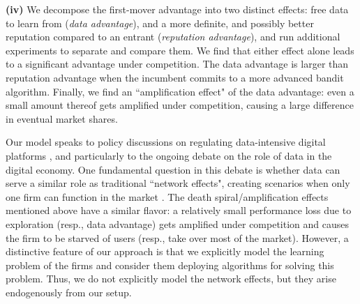 \textbf{(iv)} We decompose the first-mover advantage into two distinct effects: free data to learn from (\emph{data advantage}), and a more definite, and possibly better reputation compared to an entrant (\emph{reputation advantage}), and run additional experiments to separate and compare them. We find that either effect alone leads to a significant advantage under competition. The data advantage is larger than reputation advantage when the incumbent commits to a more advanced bandit algorithm. Finally, we find an ``amplification effect" of the data advantage: even a small amount thereof gets amplified under competition, causing a large difference in eventual market shares.



Our model speaks to policy discussions on regulating data-intensive digital platforms \citep{furman2019unlocking, scott2019committee}, and particularly to the ongoing debate on the role of data in the digital economy. One fundamental question in this debate is whether data can serve a similar role as traditional ``network effects", creating scenarios when only one firm can function in the market \citep{Rysman09, jullien2019economics}.
The death spiral/amplification effects mentioned above have a similar flavor: a relatively small performance loss due to exploration (resp., data advantage)  gets amplified under competition and causes the firm to be starved of users (resp., take over most of the market).
However, a distinctive feature of our approach is that we explicitly model the learning problem of the firms and consider them deploying algorithms for solving this problem.  Thus, we do not explicitly model the network effects, but they arise endogenously from our setup.

